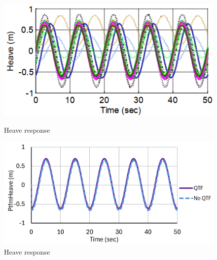 \documentclass[a4paper, 11pt]{article}
\begin{document}
\begin{figure}[H]
    \begin{minipage}{0.48\textwidth}
        \centering
        \includegraphics[width=1\textwidth]{2.1_heave.png}
        \caption{\small Heave response \cite{Robertson2014}}
        \label{fig:2.1_heave}
    \end{minipage}
    \hfill
    \begin{minipage}{0.51\textwidth}
        \centering
        \includegraphics[width=1\textwidth]{2.1_heave_mine.png}
        \caption{\small Heave response}
        \label{fig:2.1_heave_mine}
    \end{minipage}
\end{figure}
\end{document}
